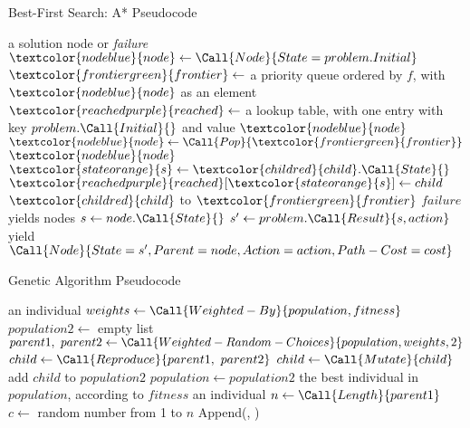 \documentclass[exam={Midterm},color=true]{cs581exam}
\begin{document}
\begin{algorithm}[H]
	\caption{Best-First Search: A* Pseudocode}\label{alg:a*}
	\begin{algorithmic}[1]
		 \Returns a solution node or \textit{failure}
		\State $\textcolor{nodeblue}{node}\gets\Call{Node}{State=problem.Initial}$
		\State $\textcolor{frontiergreen}{frontier}\gets$ a priority queue ordered by $f$, with $\textcolor{nodeblue}{node}$ as an element
		\State $\textcolor{reachedpurple}{reached}\gets$ a lookup table, with one entry with key $problem.\Call{Initial}{}$ and value $\textcolor{nodeblue}{node}$
			\State $\textcolor{nodeblue}{node}\gets\Call{Pop}{\textcolor{frontiergreen}{frontier}}$
				\Return $\textcolor{nodeblue}{node}$
			\EndIf
				\State $\textcolor{stateorange}{s}\gets \textcolor{childred}{child}.\Call{State}{}$
					\State $\textcolor{reachedpurple}{reached}[\textcolor{stateorange}{s}]\gets child$
					\State $\textcolor{childred}{child}$ to $\textcolor{frontiergreen}{frontier}$
				\EndIf
			\EndFor
		\EndWhile
		\State \Return $failure$
		\EndFunction
		 yields nodes
		\State $s\gets node.\Call{State}{}$
			\State $s'\gets problem.\Call{Result}{s, action}$
			\State {}
			\State yield $\Call{Node}{State=s', Parent=node, Action=action, Path-Cost=cost}$
		\EndFor
		\EndFunction
	\end{algorithmic}
\end{algorithm}
%
\begin{algorithm}[H]
	\caption{Genetic Algorithm Pseudocode}\label{alg:genetric-algorithm}
	\begin{algorithmic}[1]
		 \Returns an individual
		\Repeat
			\State $weights\gets\Call{Weighted-By}{population, fitness}$
			\State $population2\gets$ empty list
				\State $parent1,\ parent2\gets\Call{Weighted-Random-Choices}{population, weights, 2}$
				\State $child\gets\Call{Reproduce}{parent1,\ parent2}$
					$child\gets\Call{Mutate}{child}$
				\EndIf
				\State add $child$ to $population2$
			\EndFor
			\State $population\gets population2$
		\State \Return the best individual in $population$, according to $fitness$
		\EndFunction
		 \Returns an individual
		\State $n\gets\Call{Length}{parent1}$
		\State $c\gets$ random number from 1 to $n$
		\State \Return Append(, )
		\EndFunction
	\end{algorithmic}
\end{algorithm}
\end{document}
